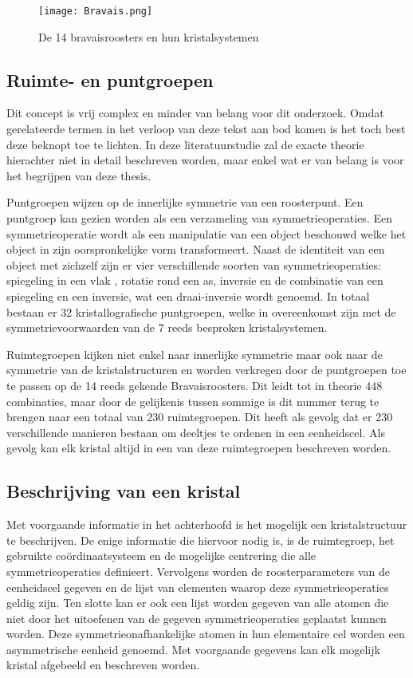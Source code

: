 \begin{figure}[H]
\texttt{[image: Bravais.png]}
\caption{De 14 bravaisroosters en hun kristalsystemen}
\end{figure}

\subsection{Ruimte- en puntgroepen}
Dit concept is vrij complex en minder van belang voor dit onderzoek. Omdat gerelateerde termen in het verloop van deze tekst aan bod komen is het toch best deze beknopt toe te lichten. In deze literatuurstudie zal de exacte theorie hierachter niet in detail beschreven worden, maar enkel wat er van belang is voor het begrijpen van deze thesis.

\par
Puntgroepen wijzen op de innerlijke symmetrie van een roosterpunt. Een puntgroep kan gezien worden als een verzameling van symmetrieoperaties. Een symmetrieoperatie wordt als een manipulatie van een object beschouwd welke het object in zijn oorspronkelijke vorm transformeert. Naast de identiteit van een object met zichzelf zijn er vier verschillende soorten van symmetrieoperaties: spiegeling in een vlak , rotatie rond een as, inversie en de combinatie van een spiegeling en een inversie, wat een draai-inversie wordt genoemd. In totaal bestaan er 32 kristallografische puntgroepen, welke in overeenkomst zijn met de symmetrievoorwaarden van de 7 reeds besproken kristalsystemen. 

\par
Ruimtegroepen kijken niet enkel naar innerlijke symmetrie maar ook naar de symmetrie van de kristalstructuren en worden verkregen door de puntgroepen toe te passen op de 14 reeds gekende Bravaisroosters. Dit leidt tot in theorie 448 combinaties, maar door de gelijkenis tussen sommige is dit nummer terug te brengen naar een totaal van 230 ruimtegroepen. Dit heeft als gevolg dat er 230 verschillende manieren bestaan om deeltjes te ordenen in een eenheidscel. Als gevolg kan elk kristal altijd in een van deze ruimtegroepen beschreven worden. 

\subsection{Beschrijving van een kristal}
Met voorgaande informatie in het achterhoofd is het mogelijk een kristalstructuur te beschrijven. De enige informatie die hiervoor nodig is, is de ruimtegroep, het gebruikte coördinaatsysteem en de mogelijke centrering die alle symmetrieoperaties definieert. Vervolgens worden de roosterparameters van de eenheidscel gegeven en de lijst van elementen waarop deze symmetrieoperaties geldig zijn. Ten slotte kan er ook een lijst worden gegeven van alle atomen die niet door het uitoefenen van de gegeven symmetrieoperaties geplaatst kunnen worden. Deze symmetrieonafhankelijke atomen in hun elementaire cel worden een asymmetrische eenheid genoemd. Met voorgaande gegevens kan elk mogelijk kristal afgebeeld en beschreven worden. 

